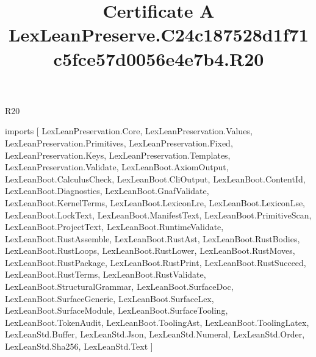 \begin{lexlean}{R20}
\title{Certificate A LexLeanPreserve.C24c187528d1f71c5fce57d0056e4e7b4.R20}
\begin{coremodule}
imports [
  LexLeanPreservation.Core,
  LexLeanPreservation.Values,
  LexLeanPreservation.Primitives,
  LexLeanPreservation.Fixed,
  LexLeanPreservation.Keys,
  LexLeanPreservation.Templates,
  LexLeanPreservation.Validate,
  LexLeanBoot.AxiomOutput,
  LexLeanBoot.CalculusCheck,
  LexLeanBoot.CliOutput,
  LexLeanBoot.ContentId,
  LexLeanBoot.Diagnostics,
  LexLeanBoot.GnafValidate,
  LexLeanBoot.KernelTerms,
  LexLeanBoot.LexiconLre,
  LexLeanBoot.LexiconLse,
  LexLeanBoot.LockText,
  LexLeanBoot.ManifestText,
  LexLeanBoot.PrimitiveScan,
  LexLeanBoot.ProjectText,
  LexLeanBoot.RuntimeValidate,
  LexLeanBoot.RustAssemble,
  LexLeanBoot.RustAst,
  LexLeanBoot.RustBodies,
  LexLeanBoot.RustLoops,
  LexLeanBoot.RustLower,
  LexLeanBoot.RustMoves,
  LexLeanBoot.RustPackage,
  LexLeanBoot.RustPrint,
  LexLeanBoot.RustSucceed,
  LexLeanBoot.RustTerms,
  LexLeanBoot.RustValidate,
  LexLeanBoot.StructuralGrammar,
  LexLeanBoot.SurfaceDoc,
  LexLeanBoot.SurfaceGeneric,
  LexLeanBoot.SurfaceLex,
  LexLeanBoot.SurfaceModule,
  LexLeanBoot.SurfaceTooling,
  LexLeanBoot.TokenAudit,
  LexLeanBoot.ToolingAst,
  LexLeanBoot.ToolingLatex,
  LexLeanStd.Buffer,
  LexLeanStd.Json,
  LexLeanStd.Numeral,
  LexLeanStd.Order,
  LexLeanStd.Sha256,
  LexLeanStd.Text
]


\end{coremodule}
\end{lexlean}
